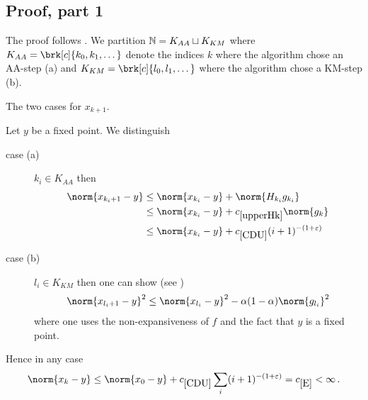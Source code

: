 \begin{frame}
	\begin{proofs}
	\vspace*{1cm}
	\centering
	\scalebox{0.9}{
	
	}
	\end{proofs}
\end{frame}
\subsection{Proof, part 1}
\begin{frame}
	\begin{proofs}
	The proof follows \cite[Theorem 6]{ZhaAA}.
	We partition $\mathbb{N}=K_{AA}\sqcup K_{KM}$ where $K_{AA}=\brk[c]{k_0,k_1,\dots}$ denote the indices $k$ where the algorithm chose an AA-step (a) and $K_{KM}=\brk[c]{l_0,l_1,\dots}$ where the algorithm chose a KM-step (b).
	
	\begin{center}
	\begin{algorithm}[H]
	\caption{The two cases for $x_{k+1}$.}
	\end{algorithm}
	\end{center}
	\end{proofs}
\end{frame}


\begin{frame}
	\begin{proofs}
	Let $y$ be a fixed point. We distinguish
	\begin{description}
		\item[case (a)]
		$k_i\in K_{AA}$ then
		\begin{equation}
		\begin{aligned}
			\norm{x_{k_i+1}-y}&\leq \norm{x_{k_i}-y}+\norm{H_{k_i}g_{k_i}} \\
			&\leq \norm{x_{k_i}-y}+\useconstant{upperHk}\norm{g_k} \\
			&\leq \norm{x_{k_i}-y}+\useconstant{CDU}(i+1)^{-(1+\e)}
			\label{eq:16}
		\end{aligned}
		\end{equation}
		\item[case (b)]
		$l_i\in K_{KM}$ then one can show (see \cite[Theorem 6]{ZhaAA})
		\begin{align}
			\norm{x_{l_i+1}-y}^2\leq \norm{x_{l_i}-y}^2-\alpha(1-\alpha)\norm{g_{l_i}}^2
			\label{eq:17}
		\end{align}
		where one uses the non-expansiveness of $f$ and the fact that $y$ is a fixed point.
	\end{description}
	Hence in any case
	\begin{align*}
		\norm{x_k-y}
		\leq \norm{x_0-y}+\useconstant{CDU}\sum_i(i+1)^{-(1+\e)}
		= \useconstant{E}<\infty\,.
	\end{align*}
	\end{proofs}
\end{frame}


